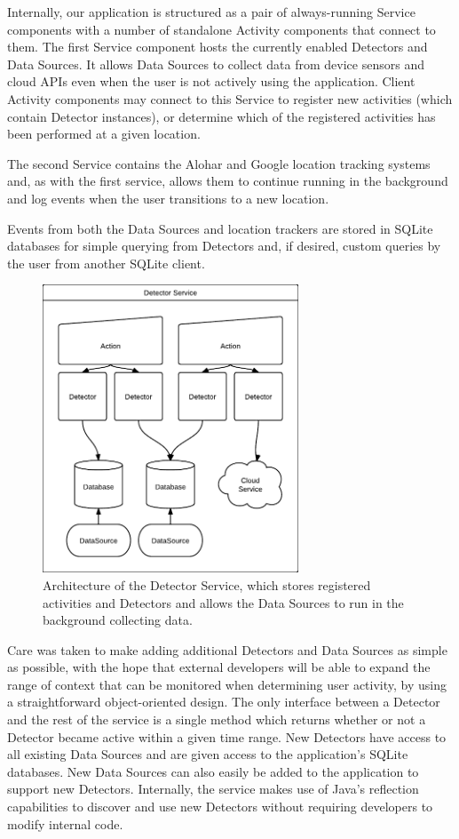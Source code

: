 \documentclass{acm_proc_article-sp}
\begin{document}
Internally, our application is structured as a pair of always-running Service components with a number of standalone Activity components that connect to them. The first Service component hosts the currently enabled Detectors and Data Sources. It allows Data Sources to collect data from device sensors and cloud APIs even when the user is not actively using the application. Client Activity components may connect to this Service to register new activities (which contain Detector instances), or determine which of the registered activities has been performed at a given location.

The second Service contains the Alohar and Google location tracking systems and, as with the first service, allows them to continue running in the background and log events when the user transitions to a new location.

Events from both the Data Sources and location trackers are stored in SQLite databases for simple querying from Detectors and, if desired, custom queries by the user from another SQLite client.

\begin{figure}
\begin{center}
\includegraphics[width=3in]{arch}
\caption{
Architecture of the Detector Service, which stores registered activities and Detectors and allows the Data Sources to run in the background collecting data.
}
\label{figure:voice}
\end{center}
\end{figure}

Care was taken to make adding additional Detectors and Data Sources as simple as possible, with the hope that external developers will be able to expand the range of context that can be monitored when determining user activity, by using a straightforward object-oriented design. The only interface between a Detector and the rest of the service is a single method which returns whether or not a Detector became active within a given time range. New Detectors have access to all existing Data Sources and are given access to the application's SQLite databases. New Data Sources can also easily be added to the application to support new Detectors. Internally, the service makes use of Java's reflection capabilities to discover and use new Detectors without requiring developers to modify internal code.
\end{document}

